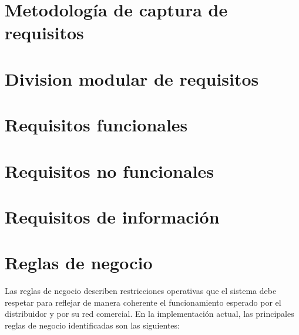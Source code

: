 \section{Metodología de captura de requisitos}
\label{sec:RequirementsCaptureMethodology}


\section{Division modular de requisitos}
\label{sec:ModularRequirements}


\section{Requisitos funcionales}
\label{sec:FunctionalRequirements}


\section{Requisitos no funcionales}
\label{sec:NonFunctionalRequirements}


\section{Requisitos de información}
\label{sec:InformationRequirements}


\section{Reglas de negocio}
Las reglas de negocio describen restricciones operativas que el sistema debe respetar para reflejar de manera coherente el funcionamiento esperado por el distribuidor y por su red comercial. En la implementación actual, las principales reglas de negocio identificadas son las siguientes:

